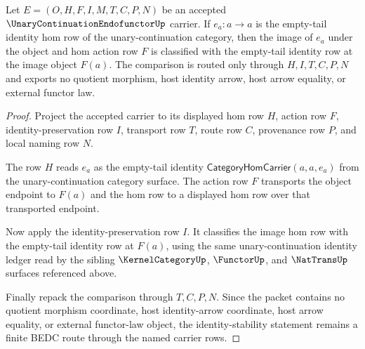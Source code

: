 \begin{theorem}
\label{thm:unary-continuation-endofunctor-identity-stability}
Let $E=(O,H,F,I,M,T,C,P,N)$ be an accepted
$\UnaryContinuationEndofunctorUp$ carrier. If $e_a:a\to a$ is the
empty-tail identity hom row of the unary-continuation category, then the image
of $e_a$ under the object and hom action row $F$ is classified with the
empty-tail identity row at the image object $F(a)$. The comparison is routed
only through $H,I,T,C,P,N$ and exports no quotient morphism, host identity
arrow, host arrow equality, or external functor law.
\end{theorem}
\begin{proof}
Project the accepted carrier to its displayed hom row $H$, action row $F$,
identity-preservation row $I$, transport row $T$, route row $C$, provenance
row $P$, and local naming row $N$.

The row $H$ reads $e_a$ as the empty-tail identity
$\mathsf{CategoryHomCarrier}(a,a,e_a)$ from the unary-continuation category
surface. The action row $F$ transports the object endpoint to $F(a)$ and the
hom row to a displayed hom row over that transported endpoint.

Now apply the identity-preservation row $I$. It classifies the image hom row
with the empty-tail identity row at $F(a)$, using the same unary-continuation
identity ledger read by the sibling $\KernelCategoryUp$, $\FunctorUp$, and
$\NatTransUp$ surfaces referenced above.

Finally repack the comparison through $T,C,P,N$. Since the packet contains no
quotient morphism coordinate, host identity-arrow coordinate, host arrow
equality, or external functor-law object, the identity-stability statement
remains a finite BEDC route through the named carrier rows.
\end{proof}

